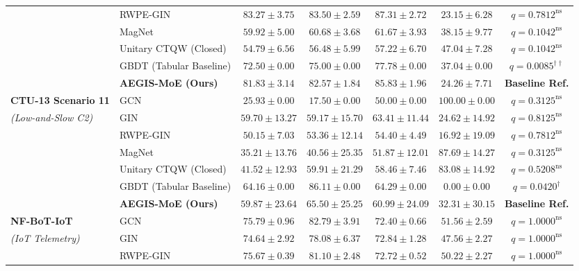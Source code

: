 \documentclass[10pt,twocolumn,letterpaper]{article}
\begin{document}
\begin{table}[t]
{\begin{tabular}{llccccc}
& RWPE-GIN & $\mathbf{83.27 \pm 3.75}$ & $\mathbf{83.50 \pm 2.59}$ & $\mathbf{87.31 \pm 2.72}$ & $23.15 \pm 6.28$ & $q = 0.7812^{\text{ns}}$ \\
& MagNet & $59.92 \pm 5.00$ & $60.68 \pm 3.68$ & $61.67 \pm 3.93$ & $38.15 \pm 9.77$ & $q = 0.1042^{\text{ns}}$ \\
& Unitary CTQW (Closed) & $54.79 \pm 6.56$ & $56.48 \pm 5.99$ & $57.22 \pm 6.70$ & $47.04 \pm 7.28$ & $q = 0.1042^{\text{ns}}$ \\
& GBDT (Tabular Baseline) & $72.50 \pm 0.00$ & $75.00 \pm 0.00$ & $77.78 \pm 0.00$ & $37.04 \pm 0.00$ & $q = 0.0085^{\dagger\dagger}$ \\
& \textbf{AEGIS-MoE (Ours)} & $81.83 \pm 3.14$ & $82.57 \pm 1.84$ & $85.83 \pm 1.96$ & $24.26 \pm 7.71$ & \textbf{Baseline Ref.} \\
\midrule
\textbf{CTU-13 Scenario 11} & GCN & $25.93 \pm 0.00$ & $17.50 \pm 0.00$ & $50.00 \pm 0.00$ & $100.00 \pm 0.00$ & $q = 0.3125^{\text{ns}}$ \\
\textit{(Low-and-Slow C2)} & GIN & $59.70 \pm 13.27$ & $59.17 \pm 15.70$ & $63.41 \pm 11.44$ & $24.62 \pm 14.92$ & $q = 0.8125^{\text{ns}}$ \\
& RWPE-GIN & $50.15 \pm 7.03$ & $53.36 \pm 12.14$ & $54.40 \pm 4.49$ & $\mathbf{16.92 \pm 19.09}$ & $q = 0.7812^{\text{ns}}$ \\
& MagNet & $35.21 \pm 13.76$ & $40.56 \pm 25.35$ & $51.87 \pm 12.01$ & $87.69 \pm 14.27$ & $q = 0.3125^{\text{ns}}$ \\
& Unitary CTQW (Closed) & $41.52 \pm 12.93$ & $59.91 \pm 21.29$ & $58.46 \pm 7.46$ & $83.08 \pm 14.92$ & $q = 0.5208^{\text{ns}}$ \\
& GBDT (Tabular Baseline) & $\mathbf{64.16 \pm 0.00}$ & $\mathbf{86.11 \pm 0.00}$ & $\mathbf{64.29 \pm 0.00}$ & $\mathbf{0.00 \pm 0.00}$ & $q = 0.0420^{\dagger}$ \\
& \textbf{AEGIS-MoE (Ours)} & $59.87 \pm 23.64$ & $65.50 \pm 25.25$ & $60.99 \pm 24.09$ & $32.31 \pm 30.15$ & \textbf{Baseline Ref.} \\
\midrule
\textbf{NF-BoT-IoT} & GCN & $75.79 \pm 0.96$ & $82.79 \pm 3.91$ & $72.40 \pm 0.66$ & $51.56 \pm 2.59$ & $q = 1.0000^{\text{ns}}$ \\
\textit{(IoT Telemetry)} & GIN & $74.64 \pm 2.92$ & $78.08 \pm 6.37$ & $72.84 \pm 1.28$ & $47.56 \pm 2.27$ & $q = 1.0000^{\text{ns}}$ \\
& RWPE-GIN & $75.67 \pm 0.39$ & $81.10 \pm 2.48$ & $72.72 \pm 0.52$ & $50.22 \pm 2.27$ & $q = 1.0000^{\text{ns}}$ \\

\end{tabular}}
\end{table}
\end{document}
